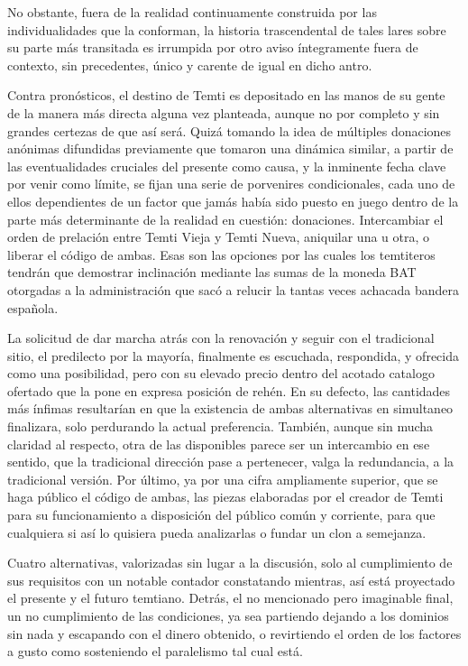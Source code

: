 \documentclass[
  spanish,
]{book}
\begin{document}
No obstante, fuera de la realidad continuamente construida por las individualidades que la conforman, la historia trascendental de tales lares sobre su parte más transitada es irrumpida por otro aviso íntegramente fuera de contexto, sin precedentes, único y carente de igual en dicho antro.

Contra pronósticos, el destino de Temti es depositado en las manos de su gente de la manera más directa alguna vez planteada, aunque no por completo y sin grandes certezas de que así será. Quizá tomando la idea de múltiples donaciones anónimas difundidas previamente que tomaron una dinámica similar, a partir de las eventualidades cruciales del presente como causa, y la inminente fecha clave por venir como límite, se fijan una serie de porvenires condicionales, cada uno de ellos dependientes de un factor que jamás había sido puesto en juego dentro de la parte más determinante de la realidad en cuestión: donaciones. Intercambiar el orden de prelación entre Temti Vieja y Temti Nueva, aniquilar una u otra, o liberar el código de ambas. Esas son las opciones por las cuales los temtiteros tendrán que demostrar inclinación mediante las sumas de la moneda BAT otorgadas a la administración que sacó a relucir la tantas veces achacada bandera española.

La solicitud de dar marcha atrás con la renovación y seguir con el tradicional sitio, el predilecto por la mayoría, finalmente es escuchada, respondida, y ofrecida como una posibilidad, pero con su elevado precio dentro del acotado catalogo ofertado que la pone en expresa posición de rehén. En su defecto, las cantidades más ínfimas resultarían en que la existencia de ambas alternativas en simultaneo finalizara, solo perdurando la actual preferencia. También, aunque sin mucha claridad al respecto, otra de las disponibles parece ser un intercambio en ese sentido, que la tradicional dirección pase a pertenecer, valga la redundancia, a la tradicional versión. Por último, ya por una cifra ampliamente superior, que se haga público el código de ambas, las piezas elaboradas por el creador de Temti para su funcionamiento a disposición del público común y corriente, para que cualquiera si así lo quisiera pueda analizarlas o fundar un clon a semejanza.

Cuatro alternativas, valorizadas sin lugar a la discusión, solo al cumplimiento de sus requisitos con un notable contador constatando mientras, así está proyectado el presente y el futuro temtiano. Detrás, el no mencionado pero imaginable final, un no cumplimiento de las condiciones, ya sea partiendo dejando a los dominios sin nada y escapando con el dinero obtenido, o revirtiendo el orden de los factores a gusto como sosteniendo el paralelismo tal cual está.
\end{document}
